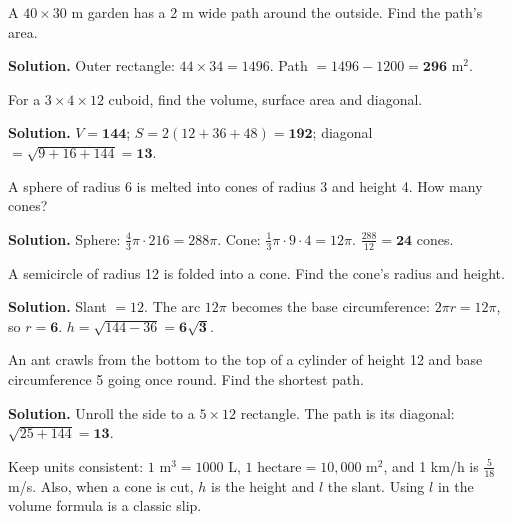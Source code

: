 \documentclass[11pt,a4paper,openany]{report}
\begin{document}
\begin{example}
A $40\times30$ m garden has a 2 m wide path around the outside. Find the path's area.

\textbf{Solution.} Outer rectangle: $44\times34=1496$. Path $=1496-1200=\mathbf{296}$ m$^2$.
\end{example}

\begin{example}[cuboid]
For a $3\times4\times12$ cuboid, find the volume, surface area and diagonal.

\textbf{Solution.} $V=\mathbf{144}$; $S=2(12+36+48)=\mathbf{192}$; diagonal $=\sqrt{9+16+144}=\mathbf{13}$.
\end{example}

\begin{example}[melting]
A sphere of radius 6 is melted into cones of radius 3 and height 4. How many cones?

\textbf{Solution.} Sphere: $\frac43\pi\cdot216=288\pi$. Cone: $\frac13\pi\cdot9\cdot4=12\pi$. $\frac{288}{12}=\mathbf{24}$ cones.
\end{example}

\begin{example}
A semicircle of radius 12 is folded into a cone. Find the cone's radius and height.

\textbf{Solution.} Slant $=12$. The arc $12\pi$ becomes the base circumference: $2\pi r=12\pi$, so $r=\mathbf{6}$. $h=\sqrt{144-36}=\mathbf{6\sqrt3}$.
\end{example}

\begin{example}
An ant crawls from the bottom to the top of a cylinder of height 12 and base circumference 5 going once round. Find the shortest path.

\textbf{Solution.} Unroll the side to a $5\times12$ rectangle. The path is its diagonal: $\sqrt{25+144}=\mathbf{13}$.
\end{example}

\begin{trap}
Keep units consistent: $1\text{ m}^3=1000\text{ L}$, $1\text{ hectare}=10{,}000\text{ m}^2$, and 1 km/h is $\frac5{18}$ m/s. Also, when a cone is cut, $h$ is the height and $l$ the slant. Using $l$ in the volume formula is a classic slip.
\end{trap}
\end{document}
